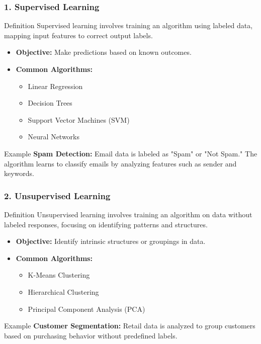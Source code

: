 \documentclass[aspectratio=169]{beamer}
\begin{document}
\begin{frame}[fragile]
    \frametitle{1. Supervised Learning}
    \begin{block}{Definition}
        Supervised learning involves training an algorithm using labeled data, mapping input features to correct output labels.
    \end{block}
    
    \begin{itemize}
        \item \textbf{Objective:} Make predictions based on known outcomes.
        \item \textbf{Common Algorithms:} 
            \begin{itemize}
                \item Linear Regression
                \item Decision Trees
                \item Support Vector Machines (SVM)
                \item Neural Networks
            \end{itemize}
    \end{itemize}
    
    \begin{block}{Example}
        \textbf{Spam Detection:} 
        Email data is labeled as "Spam" or "Not Spam." The algorithm learns to classify emails by analyzing features such as sender and keywords.
    \end{block}
\end{frame}

\begin{frame}[fragile]
    \frametitle{2. Unsupervised Learning}
    \begin{block}{Definition}
        Unsupervised learning involves training an algorithm on data without labeled responses, focusing on identifying patterns and structures.
    \end{block}
    
    \begin{itemize}
        \item \textbf{Objective:} Identify intrinsic structures or groupings in data.
        \item \textbf{Common Algorithms:} 
            \begin{itemize}
                \item K-Means Clustering
                \item Hierarchical Clustering
                \item Principal Component Analysis (PCA)
            \end{itemize}
    \end{itemize}
    
    \begin{block}{Example}
        \textbf{Customer Segmentation:} 
        Retail data is analyzed to group customers based on purchasing behavior without predefined labels.
    \end{block}
\end{frame}
\end{document}
